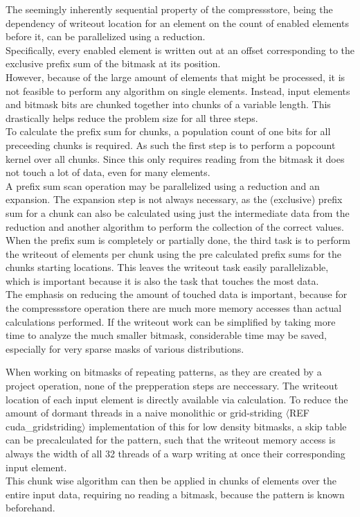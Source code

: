 \documentclass{tudscrreprt}
\newcommand{\markr}[1]{\textcolor{review}{$\langle$#1$\rangle$}}
\begin{document}
		The seemingly inherently sequential property of the compressstore, being the dependency of writeout location for an element on the count of enabled elements before it, can be parallelized using a reduction. \\
		Specifically, every enabled element is written out at an offset corresponding to the exclusive prefix sum of the bitmask at its position. \\
		
		However, because of the large amount of elements that might be processed, it is not feasible to perform any algorithm on single elements. Instead, input elements and bitmask bits are chunked together into chunks of a variable length. This drastically helps reduce the problem size for all three steps. \\
		
		To calculate the prefix sum for chunks, a population count of one bits for all preceeding chunks is required. As such the first step is to perform a popcount kernel over all chunks. Since this only requires reading from the bitmask it does not touch a lot of data, even for many elements. \\
		
		A prefix sum scan operation may be parallelized using a reduction and an expansion. The expansion step is not always necessary, as the (exclusive) prefix sum for a chunk can also be calculated using just the intermediate data from the reduction and another algorithm to perform the collection of the correct values. \\
		
		When the prefix sum is completely or partially done, the third task is to perform the writeout of elements per chunk using the pre calculated prefix sums for the chunks starting locations. This leaves the writeout task easily parallelizable, which is important because it is also the task that touches the most data. \\
		
		The emphasis on reducing the amount of touched data is important, because for the compressstore operation there are much more memory accesses than actual calculations performed. If the writeout work can be simplified by taking more time to analyze the much smaller bitmask, considerable time may be saved, especially for very sparse masks of various distributions.
	
		When working on bitmasks of repeating patterns, as they are created by a project operation, none of the prepperation steps are neccessary. The writeout location of each input element is directly available via calculation. To reduce the amount of dormant threads in a naive monolithic or grid-striding \markr{REF cuda\_gridstriding} implementation of this for low density bitmasks, a skip table can be precalculated for the pattern, such that the writeout memory access is always the width of all 32 threads of a warp writing at once their corresponding input element. \\
		This chunk wise algorithm can then be applied in chunks of elements over the entire input data, requiring no reading a bitmask, because the pattern is known beforehand. \\
	
\end{document}
